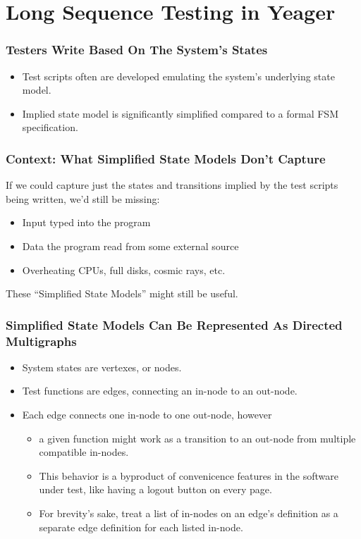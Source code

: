 \section{Long Sequence Testing in Yeager}

\begin{frame}
  \frametitle{Testers Write Based On The System's States}
  \begin{itemize}
    \item Test scripts often are developed emulating the system's underlying state model.
    \item Implied state model is significantly simplified compared to a formal FSM specification.
  \end{itemize}
\end{frame}

\begin{frame}
  \frametitle{Context: What Simplified State Models Don't Capture}
  If we could capture just the states and transitions implied by the test scripts being written, we'd still be missing:
  \begin{itemize}
    \item Input typed into the program
    \item Data the program read from some external source
    \item Overheating CPUs, full disks, cosmic rays, etc.
  \end{itemize}
  These ``Simplified State Models'' might still be useful.
\end{frame}

\begin{frame}
  \frametitle{Simplified State Models Can Be Represented As Directed Multigraphs}
  \begin{itemize}
    \item System states are vertexes, or nodes.
    \item Test functions are edges, connecting an in-node to an out-node.
    \item Each edge connects one in-node to one out-node, however
    \begin{itemize}
      \item a given function might work as a transition to an out-node from multiple compatible in-nodes.
      \item This behavior is a byproduct of convenicence features in the software under test, like having a logout button on every page.
      \item For brevity's sake, treat a list of in-nodes on an edge's definition as a separate edge definition for each listed in-node.
    \end{itemize}
  \end{itemize}
\end{frame}

